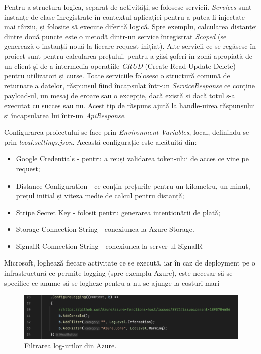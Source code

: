 Pentru a structura logica, separat de activități, se folosesc servicii. \textit{Services} sunt instanțe de clase înregistrate în
contextul aplicației pentru a putea fi injectate mai târziu, și folosite să execute diferită logică.
Spre exemplu, calcularea distanței dintre două puncte este o metodă dintr-un service înregistrat \textit{Scoped} (se generează o instanță nouă
la fiecare request inițiat). Alte servicii ce se regăsesc în proiect sunt pentru calcularea prețului, pentru 
a găsi șoferi în zonă apropiată de un client și de a intermedia operațiile \textit{CRUD} (Create Read Update Delete) pentru utilizatori și curse.
Toate serviciile folosesc o structură comună de returnare a datelor, răspunsul fiind încapsulat într-un \textit{ServiceResponse}
ce conține payload-ul, un mesaj de eroare sau o excepție, dacă există și dacă totul s-a executat cu succes sau nu. Acest tip de răspuns
ajută la handle-uirea răspunsului și încapsularea lui într-un \textit{ApiResponse}.

Configurarea proiectului se face prin \textit{Environment Variables}, local, definindu-se prin
\textit{local.settings.json}. Această configurație este alcătuită din:
\begin{itemize}
    \item Google Credentials - pentru a reuși validarea token-ului de acces ce vine pe request;
    \item Distance Configuration - ce conțin prețurile pentru un kilometru, un minut, prețul inițial și viteza medie de calcul pentru distanță;
    \item Stripe Secret Key - folosit pentru generarea intenționării de plată;
    \item Storage Connection String - conexiunea la Azure Storage.
    \item SignalR Connection String - conexiunea la server-ul SignalR
\end{itemize}

Microsoft, loghează fiecare activitate ce se execută, iar în caz de deployment pe o infrastructură ce permite logging (spre exemplu Azure),
este necesar să se specifice ce anume să se logheze pentru a nu se ajunge la costuri mari
\begin{figure}[H]
    \centering
    \includegraphics[width=16cm]{Assets/configLogging.png}
    \caption{Filtrarea log-urilor din Azure.}
    \label{fig:configLogging}
\end{figure}

